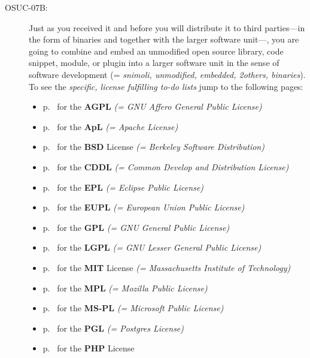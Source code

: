 \begin{description}
\item[OSUC-07B:]\label{OSUC-07B-DEF} Just as you received it and before you will
distribute it to third parties---in the form of binaries and together with the
larger software unit---, you are going to combine and embed an unmodified open
source library, code snippet, module, or plugin into a larger software unit in
the sense of software development (= \textit{snimoli, unmodified, embedded,
2others, binaries}). To see the \textit{specific, license fulfilling to-do
lists} jump to the following pages:
   \begin{itemize}
    \item p.\ \pageref{OSUC-07B-AGPL} for the \textbf{AGPL}
      \textit{(= GNU Affero General Public License)} 
    \item p.\ \pageref{OSUC-07B-Apache20} for the \textbf{ApL}
      \textit{(= Apache License)}
    \item p.\ \pageref{OSUC-07B-BSD} for the \textbf{BSD} License
      \textit{(= Berkeley Software Distribution)}
    \item p.\ \pageref{OSUC-07B-CDDL} for the \textbf{CDDL}
      \textit{(= Common Develop and Distribution License)}  
    \item p.\ \pageref{OSUC-07B-EPL} for the \textbf{EPL}
      \textit{(= Eclipse Public License)}     
    \item p.\ \pageref{OSUC-07B-EUPL} for the \textbf{EUPL}
      \textit{(= European Union Public License)} 
    \item p.\ \pageref{OSUC-07B-GPL} for the \textbf{GPL}
       \textit{(= GNU General Public License)} 
    \item p.\ \pageref{OSUC-07B-LGPL} for the \textbf{LGPL}
      \textit{(= GNU Lesser General Public License)}           
    \item p.\ \pageref{OSUC-07B-MIT} for the \textbf{MIT} License
       \textit{(= Massachusetts Institute of Technology)} 
    \item p.\ \pageref{OSUC-07B-MPL} for the \textbf{MPL}
      \textit{(= Mozilla Public License)}     
    \item p.\ \pageref{OSUC-07B-MS-PL} for the \textbf{MS-PL}
      \textit{(= Microsoft Public License)} 
    \item p.\ \pageref{OSUC-07B-PGL} for the \textbf{PGL}
      \textit{(= Postgres License)} 
    \item p.\ \pageref{OSUC-07B-PHP} for the \textbf{PHP} License 
  \end{itemize}


\end{description}
